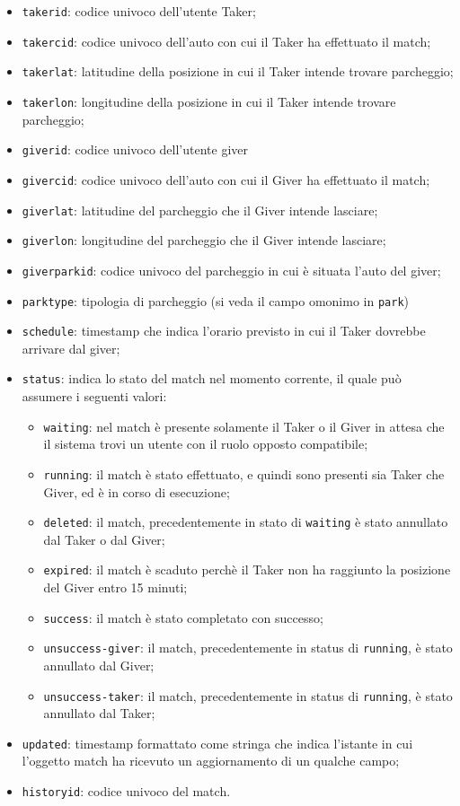 \begin{itemize}
    \item \texttt{takerid}: codice univoco dell'utente Taker;
    \item \texttt{takercid}: codice univoco dell'auto con cui il Taker ha effettuato il match;
    \item \texttt{takerlat}: latitudine della posizione in cui il Taker intende trovare parcheggio;
    \item \texttt{takerlon}: longitudine della posizione in cui il Taker intende trovare parcheggio;
    \item \texttt{giverid}: codice univoco dell'utente giver
    \item \texttt{givercid}: codice univoco dell'auto con cui il Giver ha effettuato il match;
    \item \texttt{giverlat}: latitudine del parcheggio che il Giver intende lasciare;
    \item \texttt{giverlon}: longitudine del parcheggio che il Giver intende lasciare;
    \item \texttt{giverparkid}: codice univoco del parcheggio in cui è situata l'auto del giver;
    \item \texttt{parktype}: tipologia di parcheggio (si veda il campo omonimo in \texttt{park})
    \item \texttt{schedule}: timestamp che indica l'orario previsto in cui il Taker dovrebbe arrivare dal giver;
    \item \texttt{status}: indica lo stato del match nel momento corrente, il quale può assumere i seguenti valori:

 \begin{itemize}     \item  \texttt{waiting}: nel match è presente solamente il  Taker o il Giver in attesa che il sistema trovi un  utente con il ruolo opposto compatibile;     \item  \texttt{running}: il match è stato effettuato, e quindi sono  presenti sia Taker che Giver, ed è in corso di  esecuzione;     \item  \texttt{deleted}: il match, precedentemente in stato di  \texttt{waiting} è stato annullato dal Taker o dal Giver;     \item  \texttt{expired}: il match è scaduto perchè il Taker  non ha raggiunto la posizione del Giver entro 15 minuti;     \item  \texttt{success}: il match è stato completato con successo;     \item  \texttt{unsuccess-giver}: il match, precedentemente in  status di \texttt{running}, è stato annullato dal Giver;     \item  \texttt{unsuccess-taker}: il match, precedentemente in  status di \texttt{running}, è stato annullato dal Taker; \end{itemize}
    \item \texttt{updated}: timestamp formattato come stringa che indica l'istante in cui l'oggetto match ha ricevuto un aggiornamento di un qualche campo;
    \item \texttt{historyid}: codice univoco del match.
\end{itemize}

